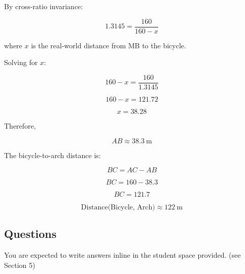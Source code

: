 \begin{studentSpace}
By cross-ratio invariance:

\[
1.3145
=
\frac{160}{160-x}
\]

where $x$ is the real-world distance from MB to the bicycle.

Solving for $x$:

\[
160-x
=
\frac{160}{1.3145}
\]

\[
160-x
=
121.72
\]

\[
x
=
38.28
\]

Therefore,

\[
\boxed{AB \approx 38.3\ \text{m}}
\]

The bicycle-to-arch distance is:

\[
BC = AC - AB
\]

\[
BC = 160 - 38.3
\]

\[
BC = 121.7
\]

\[
\boxed{\text{Distance(Bicycle, Arch)} \approx 122\ \text{m}}
\]
\end{studentSpace}


\subsection{Questions}

You are expected to write answers inline in the student space provided. (see Section 5)

